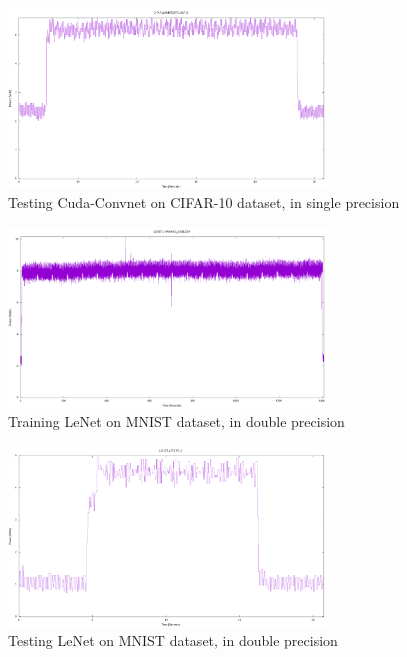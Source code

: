 \documentclass[letterpaper, 10 pt, conference]{ieeeconf}
\begin{document}
          \begin{figure}[h]
              \centering
              \includegraphics[width=85mm,scale=1]{cifar10_test_single.png}
              \caption{Testing Cuda-Convnet on CIFAR-10 dataset, in single precision}
              \label{cifar10_test_single}
          \end{figure}

          \begin{figure}[h]
              \centering
              \includegraphics[width=85mm,scale=1]{lenet_train_double.png}
              \caption{Training LeNet on MNIST dataset, in double precision}
              \label{lenet_train_double}
          \end{figure}

          \begin{figure}[h]
              \centering
              \includegraphics[width=85mm,scale=1]{lenet_test_double.png}
              \caption{Testing LeNet on MNIST dataset, in double precision}
              \label{lenet_test_double}
          \end{figure}
\end{document}
